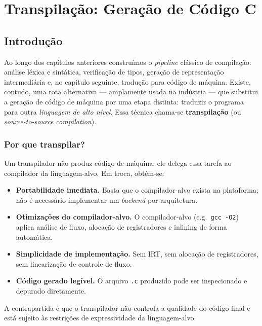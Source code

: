 \chapter{Transpilação: Geração de Código C}\label{chap:transpilacao}

\section{Introdução}\label{sec:transp-intro}

Ao longo dos capítulos anteriores construímos o \emph{pipeline} clássico de
compilação: análise léxica e sintática, verificação de tipos, geração de
representação intermediária e, no capítulo seguinte, tradução para código de
máquina.  Existe, contudo, uma rota alternativa — amplamente usada na indústria
— que substitui a geração de código de máquina por uma etapa distinta:
traduzir o programa para outra \emph{linguagem de alto nível}.  Essa técnica
chama-se \textbf{transpilação} (ou \emph{source-to-source compilation}).

\subsection{Por que transpilar?}

Um transpilador não produz código de máquina: ele delega essa tarefa ao
compilador da linguagem-alvo.  Em troca, obtém-se:

\begin{itemize}
  \item \textbf{Portabilidade imediata.}  Basta que o compilador-alvo exista
    na plataforma; não é necessário implementar um \emph{backend} por
    arquitetura.
  \item \textbf{Otimizações do compilador-alvo.}  O compilador-alvo
    (e.g.~\texttt{gcc -O2}) aplica análise de fluxo, alocação de
    registradores e inlining de forma automática.
  \item \textbf{Simplicidade de implementação.}  Sem IRT, sem alocação de
    registradores, sem linearização de controle de fluxo.
  \item \textbf{Código gerado legível.}  O arquivo \texttt{.c} produzido pode
    ser inspecionado e depurado diretamente.
\end{itemize}

A contrapartida é que o transpilador não controla a qualidade do código final
e está sujeito às restrições de expressividade da linguagem-alvo.

\begin{center}
\end{center}

